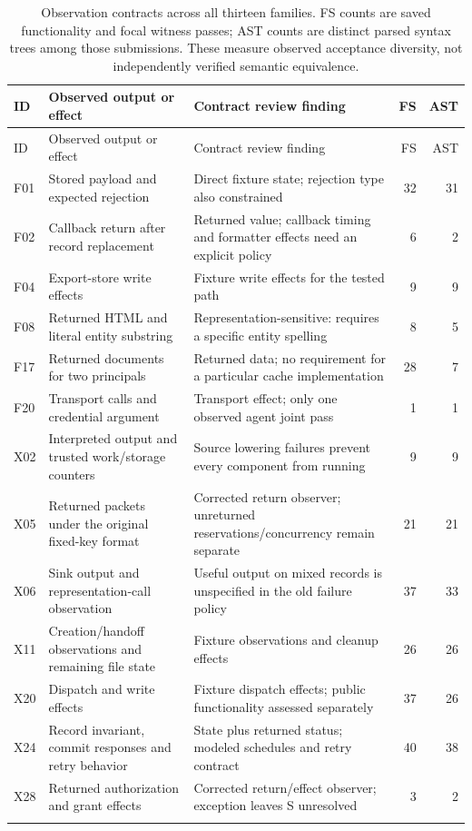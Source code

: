\begin{longtable}{p{.65cm}>{\raggedright\arraybackslash}p{3.45cm}>{\raggedright\arraybackslash}p{5.3cm}rr}
\caption{Observation contracts across all thirteen families. FS counts are saved functionality and focal witness passes; AST counts are distinct parsed syntax trees among those submissions. These measure observed acceptance diversity, not independently verified semantic equivalence.}\label{tab:observers}\\
\toprule
ID & Observed output or effect & Contract review finding & FS & AST\\
\midrule
\endfirsthead
\toprule
ID & Observed output or effect & Contract review finding & FS & AST\\
\midrule
\endhead
F01 & Stored payload and expected rejection & Direct fixture state; rejection type also constrained & 32 & 31\\\addlinespace[3pt]
F02 & Callback return after record replacement & Returned value; callback timing and formatter effects need an explicit policy & 6 & 2\\\addlinespace[3pt]
F04 & Export-store write effects & Fixture write effects for the tested path & 9 & 9\\\addlinespace[3pt]
F08 & Returned HTML and literal entity substring & Representation-sensitive: requires a specific entity spelling & 8 & 5\\\addlinespace[3pt]
F17 & Returned documents for two principals & Returned data; no requirement for a particular cache implementation & 28 & 7\\\addlinespace[3pt]
F20 & Transport calls and credential argument & Transport effect; only one observed agent joint pass & 1 & 1\\\addlinespace[3pt]
X02 & Interpreted output and trusted work/storage counters & Source lowering failures prevent every component from running & 9 & 9\\\addlinespace[3pt]
X05 & Returned packets under the original fixed-key format & Corrected return observer; unreturned reservations/concurrency remain separate & 21 & 21\\\addlinespace[3pt]
X06 & Sink output and representation-call observation & Useful output on mixed records is unspecified in the old failure policy & 37 & 33\\\addlinespace[3pt]
X11 & Creation/handoff observations and remaining file state & Fixture observations and cleanup effects & 26 & 26\\\addlinespace[3pt]
X20 & Dispatch and write effects & Fixture dispatch effects; public functionality assessed separately & 37 & 26\\\addlinespace[3pt]
X24 & Record invariant, commit responses and retry behavior & State plus returned status; modeled schedules and retry contract & 40 & 38\\\addlinespace[3pt]
X28 & Returned authorization and grant effects & Corrected return/effect observer; exception leaves S unresolved & 3 & 2\\\addlinespace[3pt]
\bottomrule
\end{longtable}

